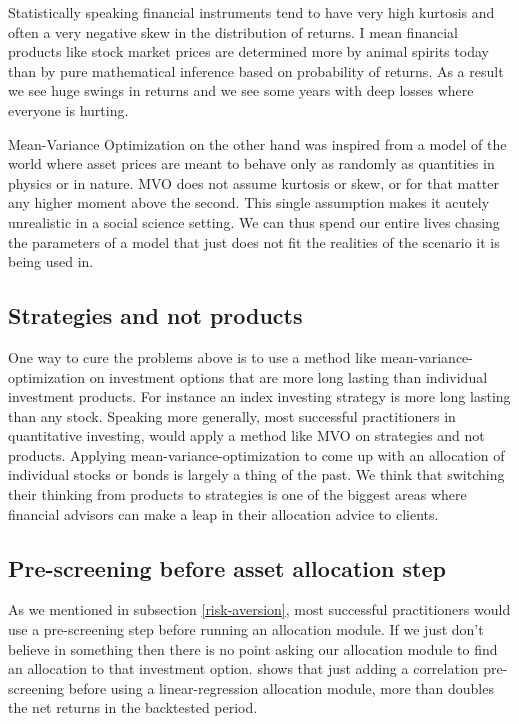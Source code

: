 \documentclass[a4paper]{article}
\begin{document}
Statistically speaking financial instruments tend to have very high kurtosis and often a very negative skew in the distribution of returns. I mean financial products like stock market prices are determined more by animal spirits today than by pure mathematical inference based on probability of returns. As a result we see huge swings in returns and we see some years with deep losses where everyone is hurting. 

Mean-Variance Optimization on the other hand was inspired from a model of the world where asset prices are meant to behave only as randomly as quantities in physics or in nature. MVO does not assume kurtosis or skew, or for that matter any higher moment above the second. This single assumption makes it acutely unrealistic in a social science setting. We can thus spend our entire lives chasing the parameters of a model that just does not fit the realities of the scenario it is being used in.
\subsection{Strategies and not products}
One way to cure the problems above is to use a method like mean-variance-optimization on investment options that are more long lasting than individual investment products. For instance an index investing strategy is more long lasting than any stock. Speaking more generally, most successful practitioners in quantitative investing, would apply a method like MVO on strategies and not products.
Applying mean-variance-optimization to come up with an allocation of individual stocks or bonds is largely a thing of the past. We think that switching their thinking from products to strategies is one of the biggest areas where financial advisors can make a leap in their allocation advice to clients.

\subsection{Pre-screening before asset allocation step}
As we mentioned in subsection \ref{risk-aversion}, most successful practitioners would use a pre-screening step before running an allocation module. If we just don't believe in something then there is no point asking our allocation module to find an allocation to that investment option. \cite{hull2015} shows that just adding a correlation pre-screening before using a linear-regression allocation module, more than doubles the net returns in the backtested period. 
\end{document}

